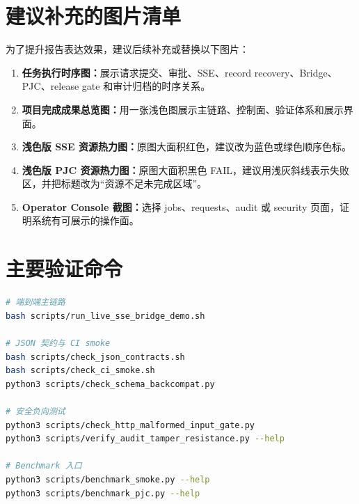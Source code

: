 \documentclass[UTF8,a4paper,12pt,oneside]{ctexrep}
\begin{document}
\appendix

\chapter{建议补充的图片清单}

为了提升报告表达效果，建议后续补充或替换以下图片：

\begin{enumerate}
  \item \textbf{任务执行时序图：}展示请求提交、审批、SSE、record recovery、Bridge、PJC、release gate 和审计归档的时序关系。
  \item \textbf{项目完成成果总览图：}用一张浅色图展示主链路、控制面、验证体系和展示界面。
  \item \textbf{浅色版 SSE 资源热力图：}原图大面积红色，建议改为蓝色或绿色顺序色标。
  \item \textbf{浅色版 PJC 资源热力图：}原图大面积黑色 FAIL，建议用浅灰斜线表示失败区，并把标题改为“资源不足未完成区域”。
  \item \textbf{Operator Console 截图：}选择 jobs、requests、audit 或 security 页面，证明系统有可展示的操作面。
\end{enumerate}

\chapter{主要验证命令}

\begin{lstlisting}[language=bash]
# 端到端主链路
bash scripts/run_live_sse_bridge_demo.sh

# JSON 契约与 CI smoke
bash scripts/check_json_contracts.sh
bash scripts/check_ci_smoke.sh
python3 scripts/check_schema_backcompat.py

# 安全负向测试
python3 scripts/check_http_malformed_input_gate.py
python3 scripts/verify_audit_tamper_resistance.py --help

# Benchmark 入口
python3 scripts/benchmark_smoke.py --help
python3 scripts/benchmark_pjc.py --help
\end{lstlisting}
\end{document}
